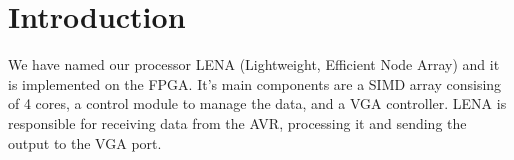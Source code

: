 \section{Introduction}

We have named our processor LENA (Lightweight, Efficient Node Array) and it is
implemented on the FPGA. It's main components are a SIMD array consising of 4
cores, a control module to manage the data, and a VGA controller. LENA is
responsible for receiving data from the AVR, processing it and sending the
output to the VGA port.
